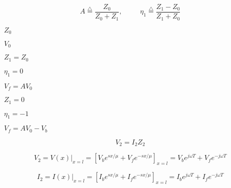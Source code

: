 {\newpage\clearpage
{}%
\begin{displaymath}	A\stackrel{\triangle}{=}\frac{Z_0}{Z_0+Z_1},\;\;\;\;\;\;\;\;\;
  \eta_1\stackrel{\triangle}{=}\frac{Z_1-Z_0}{Z_1+Z_0} \end{displaymath}%
\lthtmldisplayZ
\lthtmlcheckvsize\clearpage}

{\newpage\clearpage
{}%
$Z_0$%
\lthtmlinlinemathZ
\lthtmlcheckvsize\clearpage}

{\newpage\clearpage
{}%
$V_0$%
\lthtmlinlinemathZ
\lthtmlcheckvsize\clearpage}

{\newpage\clearpage
{}%
$Z_1=Z_0$%
\lthtmlinlinemathZ
\lthtmlcheckvsize\clearpage}

{\newpage\clearpage
{}%
$\eta_1=0$%
\lthtmlinlinemathZ
\lthtmlcheckvsize\clearpage}

{\newpage\clearpage
{}%
$V_f=A V_0$%
\lthtmlinlinemathZ
\lthtmlcheckvsize\clearpage}

{\newpage\clearpage
{}%
$Z_1=0$%
\lthtmlinlinemathZ
\lthtmlcheckvsize\clearpage}

{\newpage\clearpage
{}%
$\eta_1=-1$%
\lthtmlinlinemathZ
\lthtmlcheckvsize\clearpage}

{\newpage\clearpage
{}%
$V_f=AV_0-V_b$%
\lthtmlinlinemathZ
\lthtmlcheckvsize\clearpage}

{\newpage\clearpage
{}%
\begin{displaymath}	V_2=I_2Z_2	\end{displaymath}%
\lthtmldisplayZ
\lthtmlcheckvsize\clearpage}

{\newpage\clearpage
{}%
\begin{displaymath} V_2=V(x)|_{x=l}=[V_be^{sx/\mu}+V_fe^{-sx/\mu}]_{x=l}
  =V_be^{j\omega T}+V_fe^{-j\omega T}	\end{displaymath}%
\lthtmldisplayZ
\lthtmlcheckvsize\clearpage}

{\newpage\clearpage
{}%
\begin{displaymath} I_2=I(x)|_{x=l}=[I_be^{sx/\mu}+I_fe^{-sx/\mu}]_{x=l}
  =I_be^{j\omega T}+I_fe^{-j\omega T}	\end{displaymath}%
\lthtmldisplayZ
\lthtmlcheckvsize\clearpage}

